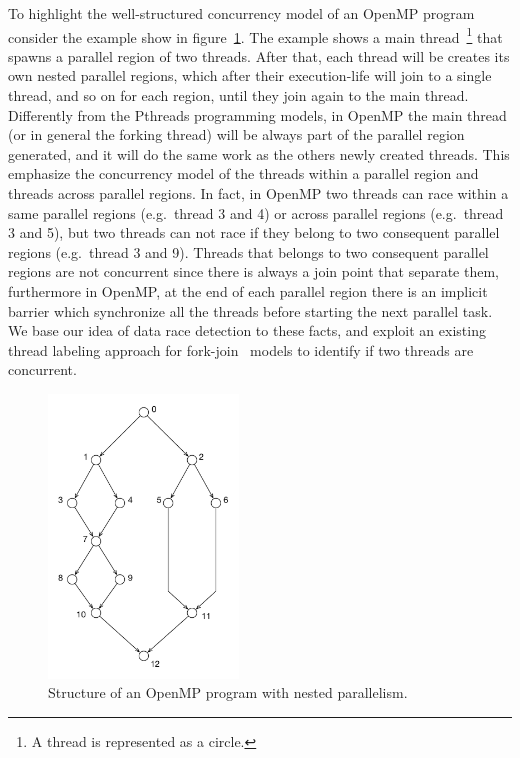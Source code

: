 To highlight the well-structured concurrency model of an OpenMP program
consider the example show in figure~\ref{fig:example01}.
%
The example shows a main thread~\footnote{A thread is represented as a
  circle.} that spawns a parallel region of two threads.
%
After that, each thread will be creates its own nested parallel regions, which
after their execution-life will join to a single thread, and so on for each
region, until they join again to the main thread.
%
Differently from the Pthreads programming models, in OpenMP the main thread
(or in general the forking thread) will be always part of the parallel region
generated, and it will do the same work as the others newly created threads.
%
This emphasize the concurrency model of the threads within a parallel region
and threads across parallel regions.
%
In fact, in OpenMP two threads can race within a same parallel regions (e.g.\
thread 3 and 4) or across parallel regions (e.g.\ thread 3 and 5), but two
threads can not race if they belong to two consequent parallel regions (e.g.\
thread 3 and 9).
%
Threads that belongs to two consequent parallel regions are not concurrent
since there is always a join point that separate them, furthermore in OpenMP,
at the end of each parallel region there is an implicit barrier which
synchronize all the threads before starting the next parallel task.
%
We base our idea of data race detection to these facts, and exploit an existing
thread labeling approach for
fork-join~\cite{Mellor-Crummey:1991:ODD:125826.125861} models to identify if
two threads are concurrent.

\begin{figure}
  \centering
  \includegraphics[width=0.45\textwidth]{figures/example01}
  \caption{Structure of an OpenMP program with nested parallelism.}
  \label{fig:example01}
\end{figure}

